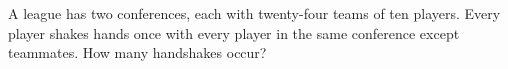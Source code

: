 A league has two conferences, each with twenty-four teams of ten players. Every player shakes hands once with every player in the same conference except teammates. How many handshakes occur?
